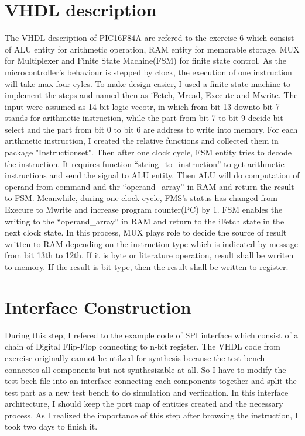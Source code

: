 \section{VHDL description} 
The VHDL description of PIC16F84A are refered to the exercise 6 which consist of ALU entity for arithmetic operation,
RAM entity for memorable storage, MUX for Multiplexer and Finite State Machine(FSM) for finite state control.
As the microcontroller's behaviour is stepped by clock, the execution of one instruction will take max four cyles.
To make design easier, I used a finite state machine to implement the steps and named then as iFetch, Mread, Execute and Mwrite.
The input were assumed as 14-bit logic vecotr, in which from bit 13 downto bit 7 stands for arithmetic instruction,
while the part from bit 7 to bit 9 decide bit select and the part from bit 0 to bit 6 are address to write into memory.
For each arithmetic instruction, I created the relative functions and collected them in package "Instructionset".  
Then after one clock cycle, FSM entity tries to decode the instruction. 
It requires function ``string\_to\_instruction'' to get arithmetic instructions and send the signal to ALU entity. 
Then ALU will do computation of operand from command and thr ``operand\_array'' in RAM and return the result to FSM. 
Meanwhile, during one clock cycle, FMS's status has changed from Execure to Mwrite and increase program counter(PC)
by 1. FSM enables the writing to the ``operand\_array'' in RAM and return to the iFetch state in the next clock state.
In this process, MUX plays role to decide the source of result written to RAM depending on the instruction type which is indicated by
message from bit 13th to 12th. If it is byte or literature operation, result shall be wrriten to memory. If the result is bit type,
then the result shall be written to register.
\section{Interface Construction}
During this step, I refered to the example code of SPI interface which consist of a chain of Digital Flip-Flop connecting to n-bit register.
The VHDL code from exercise originally cannot be utilzed for synthesis because the test bench connectes all components but not synthesizable at all.
So I have to modify the test bech file into an interface connecting each components together and split the test part as a new test bench to 
do simulation and verfication. In this interface architecture, I should keep the port map of entities created and the necessary process.
 As I realized the importance of this step after browsing the instruction, I took two days to finish it.

